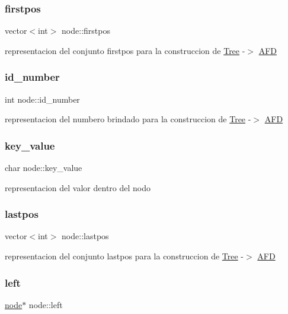 \subsubsection{\texorpdfstring{firstpos}{firstpos}}
{\footnotesize\ttfamily vector$<$int$>$ node\+::firstpos}

representacion del conjunto firstpos para la construccion de \hyperlink{class_tree}{Tree} -\/$>$ \hyperlink{class_a_f_d}{A\+FD} \hypertarget{structnode_a984474deab8020f018902d50136ec938}{}\label{structnode_a984474deab8020f018902d50136ec938} 
\subsubsection{\texorpdfstring{id\+\_\+number}{id\_number}}
{\footnotesize\ttfamily int node\+::id\+\_\+number}

representacion del numbero brindado para la construccion de \hyperlink{class_tree}{Tree} -\/$>$ \hyperlink{class_a_f_d}{A\+FD} \hypertarget{structnode_a8b75818ceb7869b3685f57334e5c1147}{}\label{structnode_a8b75818ceb7869b3685f57334e5c1147} 
\subsubsection{\texorpdfstring{key\+\_\+value}{key\_value}}
{\footnotesize\ttfamily char node\+::key\+\_\+value}

representacion del valor dentro del nodo \hypertarget{structnode_a2b8fd11a5fb1366e46dd0a2c7428733d}{}\label{structnode_a2b8fd11a5fb1366e46dd0a2c7428733d} 
\subsubsection{\texorpdfstring{lastpos}{lastpos}}
{\footnotesize\ttfamily vector$<$int$>$ node\+::lastpos}

representacion del conjunto lastpos para la construccion de \hyperlink{class_tree}{Tree} -\/$>$ \hyperlink{class_a_f_d}{A\+FD} \hypertarget{structnode_a7cbff55ff448f557223f79299056e9b1}{}\label{structnode_a7cbff55ff448f557223f79299056e9b1} 
\subsubsection{\texorpdfstring{left}{left}}
{\footnotesize\ttfamily \hyperlink{structnode}{node}$\ast$ node\+::left}

